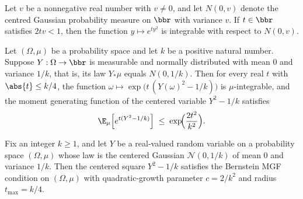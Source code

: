 \begin{lemma}
\label{integrable_exp_mul_sq_gaussianReal_zero}
\leanok
{}
Let $v$ be a nonnegative real number with $v \ne 0$, and let $N(0,v)$ denote the centred
Gaussian probability measure on $\bbr$ with variance $v$. If $t \in \bbr$ satisfies $2tv
< 1$, then the function $y \mapsto e^{t y^2}$ is integrable with respect to $N(0,v)$.
\end{lemma}

\begin{theorem}
\label{centered_chi_squared_step}
\leanok
{}
Let $(\Omega,\mu)$ be a probability space and let $k$ be a positive natural number.
Suppose $Y:\Omega\to\bbr$ is measurable and normally distributed with mean $0$ and
variance $1/k$, that is, its law $Y_*\mu$ equals $N(0,1/k)$. Then for every real $t$
with $\abs{t}\le k/4$, the function $\omega\mapsto \exp\!\bigl(t\,(Y(\omega)^2 -
1/k)\bigr)$ is $\mu$-integrable, and the moment generating function of the centered
variable $Y^2 - 1/k$ satisfies
\[
  \E_\mu\!\left[e^{t(Y^2 - 1/k)}\right] \;\le\; \exp\!\Bigl(\frac{2t^2}{k^2}\Bigr).
\]
\end{theorem}

\begin{theorem}
\label{hasBernsteinMGF_centered_chi_squared}
\leanok
{}
Fix an integer $k \ge 1$, and let $Y$ be a real-valued random variable on a probability
space $(\Omega, \mu)$ whose law is the centered Gaussian $\mathcal{N}(0, 1/k)$ of mean
$0$ and variance $1/k$. Then the centered square $Y^2 - 1/k$ satisfies the Bernstein MGF
condition on $(\Omega, \mu)$ with quadratic-growth parameter $c = 2/k^2$ and radius
$t_{\max} = k/4$.
\end{theorem}

